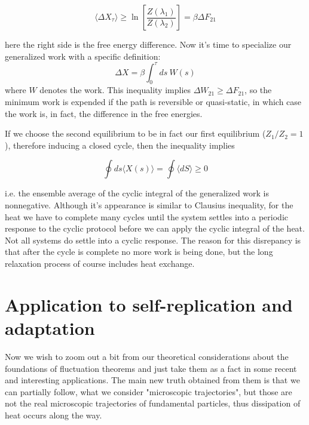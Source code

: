 \documentclass[a4paper,12pt]{article}
\begin{document}
\begin{equation}
  \langle \Delta X_\tau \rangle \geq \ln\left[\frac{Z(\lambda_1)}{Z(\lambda_2)}\right]=\beta \Delta F_{21}
\end{equation}

here the right side is the free energy difference. Now it's time to specialize our generalized work with a specific definition:
\begin{equation}
  \Delta X = \beta \int_0^\tau ds\ W(s)
\end{equation}
where $W$ denotes the work. This inequality implies $\Delta W_{21} \geq \Delta F_{21} $, so the minimum work is expended if the path is reversible or quasi-static, in which case the work is, in fact, the difference in the free energies.%

If we choose the second equilibrium to be in fact our first equilibrium ($Z_1/Z_2=1$), therefore inducing a closed cycle, then the inequality implies

\begin{equation}
\label{CyclicInequalityForGeneralizedWork}
  \oint ds \langle X(s) \rangle = \oint \langle dS \rangle \geq 0
\end{equation}

i.e. the ensemble average of the cyclic integral of the generalized work is nonnegative.
Although it's appearance is similar to Clausius inequality, for the heat we have to complete many cycles until the system settles into a periodic response to the cyclic protocol before we can apply the cyclic integral of the heat. Not all systems do settle into a cyclic response. The reason for this disrepancy is that after the cycle is complete no more work is being done, but the long relaxation process of course includes heat exchange. 

\section{Application to self-replication and adaptation}

Now we wish to zoom out a bit from our theoretical considerations about the foundations of fluctuation theorems and just take them as a fact in some recent and interesting applications\cite{Perunov:2016hl}\cite{England:2013ed}. The main new truth obtained from them is that we can partially follow, what we consider "microscopic trajectories", but those are not the real microscopic trajectories of fundamental particles, thus dissipation of heat occurs along the way.
\end{document}
